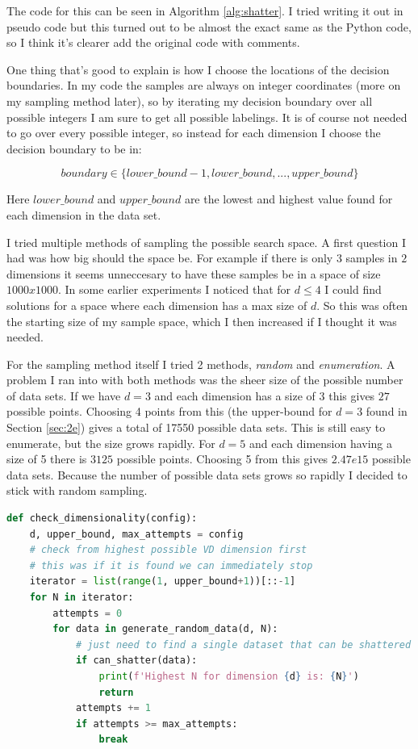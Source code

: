 \documentclass[11pt,a4paper]{article}
\begin{document}
The code for this can be seen in Algorithm \ref{alg:shatter}. I tried writing it out in pseudo code but this turned out to be almost the exact same as the Python code, so I think it's clearer add the original code with comments.

One thing that's good to explain is how I choose the locations of the decision boundaries. In my code the samples are always on integer coordinates (more on my sampling method later), so by iterating my decision boundary over all possible integers I am sure to get all possible labelings. It is of course not needed to go over every possible integer, so instead for each dimension I choose the decision boundary to be in:

\[ boundary \in \{lower\_bound - 1, lower\_bound, ..., upper\_bound\} \]

Here $lower\_bound$ and $upper\_bound$ are the lowest and highest value found for each dimension in the data set. 

I tried multiple methods of sampling the possible search space. A first question I had was how big should the space be. For example if there is only $3$ samples in $2$ dimensions it seems unneccesary to have these samples be in a space of size $1000x1000$. In some earlier experiments I noticed that for $d \leq 4$ I could find solutions for a space where each dimension has a max size of $d$. So this was often the starting size of my sample space, which I then increased if I thought it was needed.

For the sampling method itself I tried 2 methods, \textit{random} and \textit{enumeration}. A problem I ran into with both methods was the sheer size of the possible number of data sets. If we have $d=3$ and each dimension has a size of $3$ this gives $27$ possible points. Choosing 4 points from this (the upper-bound for $d=3$ found in Section \ref{sec:2e}) gives a total of 17550 possible data sets. This is still easy to enumerate, but the size grows rapidly. For $d=5$ and each dimension having a size of 5 there is $3125$ possible points. Choosing 5 from this gives $2.47e15$ possible data sets. Because the number of possible data sets grows so rapidly I decided to stick with random sampling.

\begin{lstlisting}[language=Python, caption=Dimensionality Check, label={alg:finder}]
def check_dimensionality(config):
    d, upper_bound, max_attempts = config
    # check from highest possible VD dimension first
    # this was if it is found we can immediately stop
    iterator = list(range(1, upper_bound+1))[::-1]
    for N in iterator:
        attempts = 0
        for data in generate_random_data(d, N):
            # just need to find a single dataset that can be shattered
            if can_shatter(data):
                print(f'Highest N for dimension {d} is: {N}')
                return
            attempts += 1
            if attempts >= max_attempts:
                break
    \end{lstlisting}
\end{document}

